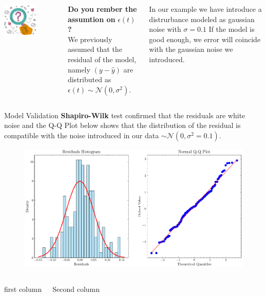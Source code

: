 \documentclass[aspectratio=169,hyperref={pdfpagelabels=false}]{beamer}
\begin{document}
\begin{frame}{}
  \begin{columns}
  \includegraphics[width=0.6\textwidth]{img/pic5.png} \centering
  
    \textbf{Do you rember the assumtion on} $\epsilon(t)$ \textbf{?} \centering \\
    \vspace{2em}
    We previously assumed that the residual of the model, namely $(y - \hat{y})$ 
    are distributed as $\epsilon(t)\sim \mathcal{N}(0,\sigma^2)$.
    \vspace{2em}

    In our example we have introduce a distrurbance modeled as gaussian noise with $\sigma = 0.1$
    If the model is good enough, we error will coincide with the gaussian noise we introduced.
  \end{columns}
\end{frame}

\begin{frame}{Model Validation}
  \textbf{Shapiro-Wilk} test confirmed that the residuals are white noise and the Q-Q Plot below shows that the distribution of the residual is compatible with the noise introduced in our data $\sim \mathcal{N}(0,\sigma^2 = 0.1)$.
  \begin{figure}
    \centering
    \includegraphics[width=0.7\linewidth]{img/residuals_analysis.pdf}
  \end{figure}
\end{frame}

\begin{frame}
  \begin{columns}
  first column 
  
Second column 
  \end{columns}
\end{frame}
\end{document}
